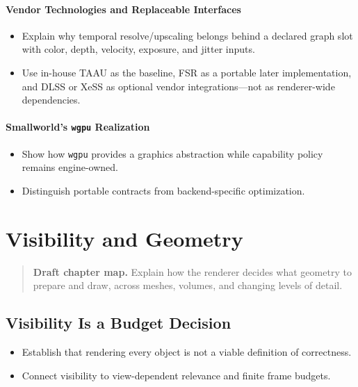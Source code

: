 \documentclass[
  11pt,
  letterpaper,
  DIV=11,
  numbers=noendperiod,
  twoside,
  open=right]{scrreprt}
\providecommand{\tightlist}{%
  \setlength{\itemsep}{0pt}\setlength{\parskip}{0pt}}
\begin{document}
\subsubsection{Vendor Technologies and Replaceable
Interfaces}\label{vendor-technologies-and-replaceable-interfaces}

\begin{itemize}
\tightlist
\item
  Explain why temporal resolve/upscaling belongs behind a declared graph
  slot with color, depth, velocity, exposure, and jitter inputs.
\item
  Use in-house TAAU as the baseline, FSR as a portable later
  implementation, and DLSS or XeSS as optional vendor integrations---not
  as renderer-wide dependencies.
\end{itemize}

\subsubsection{\texorpdfstring{Smallworld's \texttt{wgpu}
Realization}{Smallworld's wgpu Realization}}\label{smallworlds-wgpu-realization}

\begin{itemize}
\tightlist
\item
  Show how \texttt{wgpu} provides a graphics abstraction while
  capability policy remains engine-owned.
\item
  Distinguish portable contracts from backend-specific optimization.
\end{itemize}

\chapter{Visibility and Geometry}\label{visibility-and-geometry}

\begin{quote}
\textbf{Draft chapter map.} Explain how the renderer decides what
geometry to prepare and draw, across meshes, volumes, and changing
levels of detail.
\end{quote}

\section{Visibility Is a Budget
Decision}\label{visibility-is-a-budget-decision}

\begin{itemize}
\tightlist
\item
  Establish that rendering every object is not a viable definition of
  correctness.
\item
  Connect visibility to view-dependent relevance and finite frame
  budgets.
\end{itemize}
\end{document}

